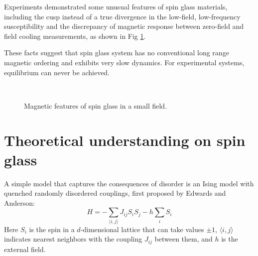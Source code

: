 Experiments demonstrated some unusual features of spin glass materials, 
including the cusp instead of a true divergence in the low-field, low-frequency 
susceptibility and the discrepancy of magnetic response between zero-field and field cooling 
measurements, as shown in Fig \ref{fig:experimentsSG}. 

These facts suggest that spin glass system has no conventional 
long range magnetic ordering and exhibits very slow dynamics. For experimental systems, 
equilibrium can  never be achieved. 

\begin{figure}[!h]
  \label{fig:experimentsSG}
  \centering
  \\  
  \caption{Magnetic features of spin glass in a small field.}
\end{figure}

\section{Theoretical understanding on spin glass}
A simple model that captures the consequences of disorder is an Ising model 
with quenched randomly disordered couplings, first proposed by Edwards and 
Anderson:
\begin{equation}
  \label{eq:EA}
  H=-\sum_{\langle i,j \rangle}J_{ij}S_iS_j-h\sum_iS_i
\end{equation}
Here $S_i$ is the spin in a $d$-dimensional lattice that can take values $\pm 1$,
$\langle i,j \rangle$ indicates nearest neighbors with the coupling $J_{ij}$ between 
them, and $h$ is the external field.
 
